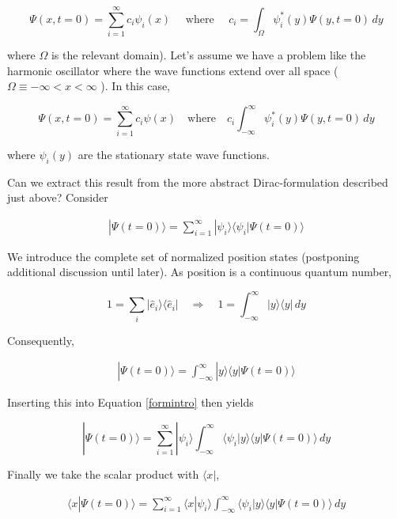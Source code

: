 \[
\Psi(x, t = 0) = \sum_{i=1}^{\infty} c_i \psi_i(x) \quad \text{ where } \quad
c_i = \int_\Omega \psi_i^*(y) \Psi(y, t = 0) \, dy
\] \vspace{3px}

where $\Omega$ is the relevant domain). Let's assume we have a problem like
the harmonic oscillator where the wave functions extend over all space
($\Omega \equiv -\infty < x < \infty$ ). In this case, 

\[
\Psi(x, t=0) = \sum_{i=1}^{\infty} c_i\psi(x) \quad \text{where} \quad c_i
\int_{-\infty}^{\infty} \psi_i^*(y) \Psi(y, t=0)\, dy
\] \vspace{3px}

where $\psi_i(y)$ are the stationary state wave functions. 

Can we extract this result from the more abstract Dirac-formulation described
just above? Consider

\begin{align} \label{formintro}
|\Psi(t = 0)\rangle = \sum_{i=1}^{\infty} |\psi_i\rangle \langle \psi_i
| \Psi(t=0) \rangle 
\end{align} \vspace{3px}

We introduce the complete set of normalized position states (postponing
additional discussion until later). As position is a continuous quantum number, 

\[
1 = \sum_{i}^{}  |\hat{e}_i\rangle \langle \hat{e}_i | \quad \Rightarrow \quad
  1 = \int_{-\infty}^{\infty} |y\rangle \langle y | \, dy
\] \vspace{3px}

Consequently, 

\begin{align} \label{formintro_2}
|\Psi(t = 0)\rangle = \int_{-\infty}^{\infty} |y\rangle \langle
y | \Psi(t=0)\rangle
\end{align} \vspace{3px}

Inserting this into Equation \ref{formintro} then yields 

\[
|\Psi(t = 0)\rangle = \sum_{i=1}^{\infty} |\psi_i\rangle
\int_{-\infty}^{\infty} \langle \psi_i | y \rangle \langle y | \Psi(t
= 0)\rangle \, dy
\] \vspace{3px}

Finally we take the scalar product with $\langle x |$, 

\begin{align} \label{formintro_3}
\langle x | \Psi(t = 0) \rangle = \sum_{i=1}^{\infty}  \langle
x | \psi_i\rangle \int_{-\infty}^{\infty} \langle \psi_i | y\rangle \langle
y | \Psi(t = 0)\rangle \, dy
\end{align} \vspace{3px}

